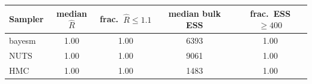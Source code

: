 \begin{tabular}{lcccc}
\toprule
Sampler & median $\widehat{R}$ & frac.\ $\widehat{R} \leq 1.1$ & median bulk ESS & frac.\ ESS $\geq 400$ \\
\midrule
bayesm & 1.00 & 1.00 & 6393 & 1.00 \\
NUTS & 1.00 & 1.00 & 9061 & 1.00 \\
HMC & 1.00 & 1.00 & 1483 & 1.00 \\
\bottomrule
\end{tabular}
